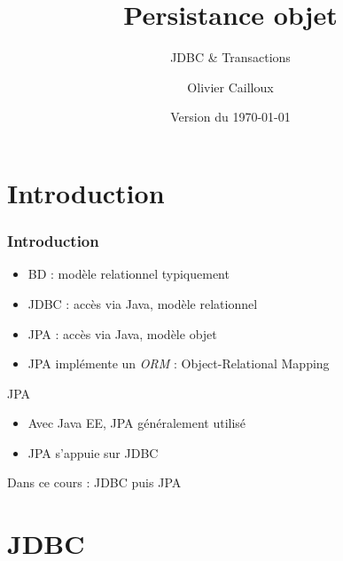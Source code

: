 \documentclass[english, french]{beamer}
\title{Persistance objet}
\subtitle{JDBC \& Transactions}
\author{Olivier Cailloux}
\institute[LAMSADE]{LAMSADE, Université Paris-Dauphine}
\date{Version du \today}
\begin{document}


\begin{frame}[plain]
   \titlepage
\end{frame}
\addtocounter{framenumber}{-1}

\section{Introduction}
\begin{frame}
	\frametitle{Introduction}
	\begin{itemize}
		\item BD : modèle relationnel {\tiny typiquement}
		\item JDBC : accès via Java, modèle relationnel
		\item JPA : accès via Java, modèle objet
		\item JPA implémente un \emph{ORM} : Object-Relational Mapping
	\end{itemize}
	\begin{block}{JPA}
		\begin{itemize}
			\item Avec Java EE, JPA généralement utilisé
			\item JPA s’appuie sur JDBC
		\end{itemize}
	\end{block}
	Dans ce cours : JDBC puis JPA
\end{frame}

\section{JDBC}
\end{document}
